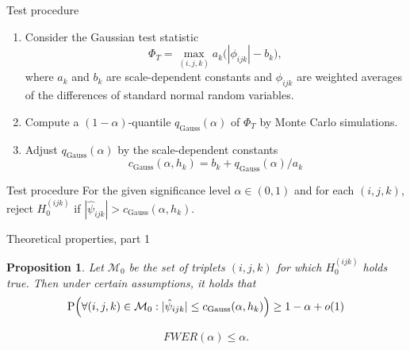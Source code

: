 \documentclass[10pt]{beamer}
\newcommand{\Prob}{\mathrm{P}}
\newtheorem{prop}{Proposition}
\begin{document}
\begin{frame}[label = frame_test]{Test procedure}

\begin{enumerate}
	\item Consider the Gaussian test statistic 
	\vspace{-2mm} \[ \Phi_T = \max_{(i,j,k)} a_k \big( |\phi_{ijk}| - b_k \big), \] where $a_k$ and $b_k$ are scale-dependent constants and $\phi_{ijk}$ are weighted averages of the differences of standard normal random variables.\pause
	\item Compute a $(1-\alpha)$-quantile $q_{\text{Gauss}} (\alpha)$ of $\Phi_T$ by Monte Carlo simulations.\pause
	\item Adjust $q_{ \text{Gauss}} (\alpha)$ by the scale-dependent constants \vspace{-2mm}  \[c_{\text{Gauss}}(\alpha,h_k) = b_k + q_{\text{Gauss}}(\alpha)/a_k\] \pause
\end{enumerate}
\vspace{-5mm}
\begin{block}{Test procedure}
For the given significance level $\alpha \in (0,1)$ and for each $(i,j,k)$, reject $H_0^{(ijk)}$ if $|\widehat{\psi}_{ijk}| > c_{\text{Gauss}}(\alpha,h_k)$.

\end{block}
\end{frame}


\begin{frame}{Theoretical properties, part 1}
\begin{prop}\label{prop1}
Let $\mathcal{M}_0$ be the set of triplets $(i, j, k)$ for which $H_0^{(ijk)}$ holds true. Then under certain assumptions, it holds that 
\vspace{-2mm}
\begin{align*}
 \Prob\Big( \forall (i,j,k) \in \mathcal{M}_0: |\hat{\psi}_{ijk}| \le c_{\textnormal{Gauss}}(\alpha,h_k) \Big) \ge 1 - \alpha + o(1)
\end{align*}
\end{prop}\pause
\begin{corollary}
\vspace{-3mm}
\begin{align*}
	FWER(\alpha) \leq \alpha.
\end{align*}
\end{corollary}
\end{frame}
\end{document}
